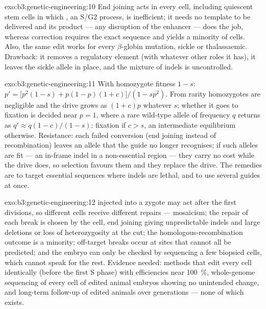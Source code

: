 \begin{solution}{exo:b3:genetic-engineering:10}
End joining acts in every cell, including quiescent stem cells in
which , an S/G2 process, is inefficient; it
needs no template to be delivered and its product --- any disruption of
the enhancer --- does the job, whereas correction requires the exact
sequence and yields a minority of cells. Also, the same edit works for
every $\beta$-globin mutation, sickle or thalassaemic. Drawback: it
removes a regulatory element (with whatever other roles it has), it
leaves the sickle allele in place, and the mixture of indels is
uncontrolled.
\end{solution}

\begin{solution}{exo:b3:genetic-engineering:11}
With homozygote fitness $1 - s$: $p' = \bigl[p^{2}(1-s) + p(1-p)(1+c)
\bigr]/(1 - sp^{2})$. From rarity homozygotes are negligible and the
drive grows as $(1+c)p$ whatever $s$; whether it goes to fixation is
decided near $p = 1$, where a rare wild-type allele of frequency $q$
returns as $q' \approx q(1-c)/(1-s)$: fixation if $c > s$, an
intermediate equilibrium otherwise. Resistance: each failed conversion
(end joining instead of recombination) leaves an allele that the guide
no longer recognises; if such alleles are fit --- an in-frame indel in
a non-essential region --- they carry no cost while the drive does, so
selection favours them and they replace the drive. The remedies are to
target essential sequences where indels are lethal, and to use several
guides at once.
\end{solution}

\begin{solution}{exo:b3:genetic-engineering:12}
 injected into a zygote may act after the first divisions, so
different cells receive different repairs --- mosaicism; the repair of
each break is chosen by the cell, end joining giving unpredictable
indels and large deletions or loss of heterozygosity at the cut; the
homologous-recombination outcome is a minority; off-target breaks
occur at sites that cannot all be predicted; and the embryo can only
be checked by sequencing a few biopsied cells, which cannot speak for
the rest. Evidence needed: methods that edit every cell identically
(before the first S phase) with efficiencies near \qty{100}{\%},
whole-genome sequencing of every cell of edited animal embryos showing
no unintended change, and long-term follow-up of edited animals over
generations --- none of which exists.
\end{solution}

